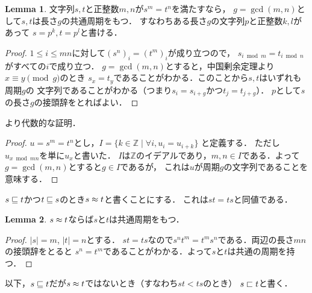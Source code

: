 \documentclass{scrartcl}
\theoremstyle{definition}
\newtheorem{lemma}{Lemma}
\begin{document}
\begin{lemma}
  文字列$s,t$と正整数$m,n$が$s^m = t^n$を満たすなら，
  $g = \gcd(m,n)$として$s, t$は長さ$g$の共通周期をもつ．
  すなわちある長さ$g$の文字列$p$と正整数$k, l$があって
  $s = p^k, t = p^l$と書ける．
\end{lemma}
\begin{proof}
  $1 \le i \le mn$に対して$(s^n)_i = (t^m)_i$が成り立つので，
  $s_{i \bmod m} = t_{i \bmod n}$がすべての$i$で成り立つ．
  $g = \gcd(m,n)$とすると，中国剰余定理より$x \equiv y \pmod g$のとき
  $s_x = t_y$であることがわかる．このことから$s, t$はいずれも周期$g$の
  文字列であることがわかる（つまり$s_i = s_{i+g}$かつ$t_j = t_{j+g}$）．
  $p$として$s$の長さ$g$の接頭辞をとればよい．
\end{proof}
より代数的な証明．
\begin{proof}
  $u = s^m = t^n$とし，$I = \{ k \in \mathbb Z \mid \forall i, u_i = u_{i+k}\}$
  と定義する．
  ただし$u_{x \bmod mn}$を単に$u_x$と書いた．
  $I$は$\mathbb Z$のイデアルであり，$m, n \in I$である．よって
  $g = \gcd(m,n)$とすると$g \in I$であるが，
  これは$u$が周期$g$の文字列であることを意味する．
\end{proof}


$s \sqsubseteq t$かつ$t \sqsubseteq s$のとき$s \approx t$と書くことにする．
これは$st = ts$と同値である．
\begin{lemma}
  $s \approx t$ならば$s$と$t$は共通周期をもつ．
\end{lemma}
\begin{proof}
  $|s| = m$, $|t| = n$とする．
  $st = ts$なので$s^nt^m = t^ms^n$である．両辺の長さ$mn$の接頭辞をとると
  $s^n = t^m$であることがわかる．よって$s$と$t$は共通の周期を持つ．
\end{proof}

以下，$s \sqsubseteq t$だが$s \approx t$ではないとき（すなわち$st < ts$のとき）
$s \sqsubset t$と書く．
\end{document}
